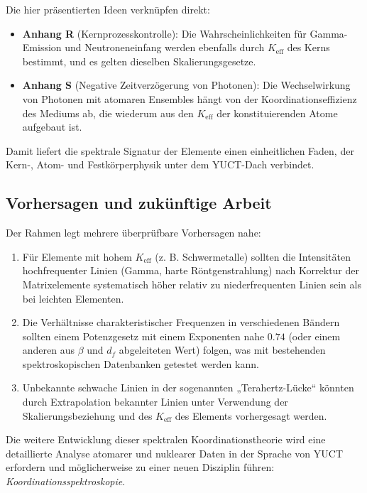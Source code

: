 \documentclass[12pt,a4paper]{article}
\begin{document}
	Die hier präsentierten Ideen verknüpfen direkt:
	\begin{itemize}
		\item \textbf{Anhang R} (Kernprozesskontrolle): Die Wahrscheinlichkeiten für Gamma-Emission und Neutroneneinfang werden ebenfalls durch \(K_{\mathrm{eff}}\) des Kerns bestimmt, und es gelten dieselben Skalierungsgesetze.
		\item \textbf{Anhang S} (Negative Zeitverzögerung von Photonen): Die Wechselwirkung von Photonen mit atomaren Ensembles hängt von der Koordinationseffizienz des Mediums ab, die wiederum aus den \(K_{\mathrm{eff}}\) der konstituierenden Atome aufgebaut ist.
	\end{itemize}
	Damit liefert die spektrale Signatur der Elemente einen einheitlichen Faden, der Kern-, Atom- und Festkörperphysik unter dem YUCT-Dach verbindet.
	
	\subsection{Vorhersagen und zukünftige Arbeit}
	
	Der Rahmen legt mehrere überprüfbare Vorhersagen nahe:
	\begin{enumerate}
		\item Für Elemente mit hohem \(K_{\mathrm{eff}}\) (z. B. Schwermetalle) sollten die Intensitäten hochfrequenter Linien (Gamma, harte Röntgenstrahlung) nach Korrektur der Matrixelemente systematisch höher relativ zu niederfrequenten Linien sein als bei leichten Elementen.
		\item Die Verhältnisse charakteristischer Frequenzen in verschiedenen Bändern sollten einem Potenzgesetz mit einem Exponenten nahe \(0.74\) (oder einem anderen aus \(\beta\) und \(d_f\) abgeleiteten Wert) folgen, was mit bestehenden spektroskopischen Datenbanken getestet werden kann.
		\item Unbekannte schwache Linien in der sogenannten „Terahertz-Lücke“ könnten durch Extrapolation bekannter Linien unter Verwendung der Skalierungsbeziehung und des \(K_{\mathrm{eff}}\) des Elements vorhergesagt werden.
	\end{enumerate}
	
	Die weitere Entwicklung dieser spektralen Koordinationstheorie wird eine detaillierte Analyse atomarer und nuklearer Daten in der Sprache von YUCT erfordern und möglicherweise zu einer neuen Disziplin führen: \emph{Koordinationsspektroskopie}.
	
\end{document}
